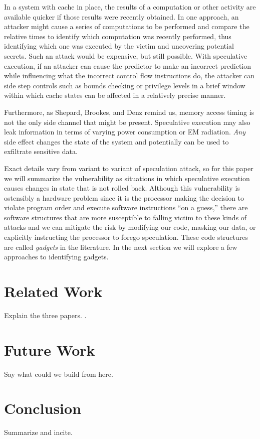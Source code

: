 \documentclass[11pt,conference]{IEEEtran}
\begin{document}
In a system with cache in place, the results of a computation or other activity are available quicker if those results were recently obtained.
In one approach, an attacker might cause a series of computations to be performed and compare the relative times to identify which computation was recently performed, thus identifying which one was executed by the victim and uncovering potential secrets.
Such an attack would be expensive, but still possible.
With speculative execution, if an attacker can cause the predictor to make an incorrect prediction while influencing what the incorrect control flow instructions do, the attacker can side step controls such as bounds checking or privilege levels in a brief window within which cache states can be affected in a relatively precise manner.

Furthermore, as Shepard, Brookes, and Denz\cite{shepherd2022transient} remind us, memory access timing is not the only side channel that might be present.
Speculative execution may also leak information in terms of varying power consumption or EM radiation.
\emph{Any} side effect changes the state of the system and potentially can be used to exfiltrate sensitive data.

Exact details vary from variant to variant of speculation attack, so for this paper we will summarize the vulnerability as situations in which speculative execution causes changes in state that is not rolled back.
Although this vulnerability is ostensibly a hardware problem since it is the processor making the decision to violate program order and execute software instructions ``on a guess,'' there are software structures that are more susceptible to falling victim to these kinds of attacks and we can mitigate the risk by modifying our code, masking our data, or explicitly instructing the processor to forego speculation.
These code structures are called \emph{gadgets} in the literature.
In the next section we will explore a few approaches to identifying gadgets.

\section{Related Work}\label{sec:related}
Explain the three papers.
\cite{mosier2022}.
\cite{canella2019}
\cite{cats2022}
\section{Future Work}\label{sec:future}
Say what could we build from here.
\section{Conclusion}
Summarize and incite.
\end{document}
